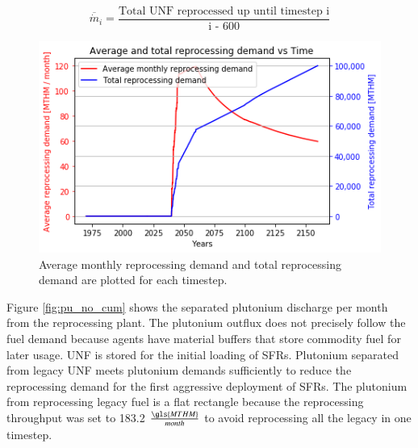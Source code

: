 \begin{equation}
\label{eqn:avg_rep}
\overline{\dot{m}}_i = \frac{\text{Total UNF reprocessed up until timestep i}}{\text{i - 600}}
\end{equation}


\begin{figure}[htbp!]
	\begin{center}
		\includegraphics[width=1.0\textwidth]{./images/french-transition/avg_tot_rep.png}
	\end{center}
	\caption{Average monthly reprocessing demand and total reprocessing demand are plotted
			 for each timestep.}
	\label{fig:avg_tot_rep}
\end{figure}



Figure \ref{fig:pu_no_cum} shows the separated plutonium discharge per 
month from the reprocessing plant. The plutonium outflux does not precisely 
follow the fuel demand because \Cyclus agents have material buffers that 
store commodity fuel for later usage. 
\gls{UNF} is stored for the initial loading of \glspl{SFR}.  Plutonium separated 
from legacy \gls{UNF} meets plutonium demands sufficiently to reduce the 
reprocessing demand for the first aggressive deployment of \glspl{SFR}.  
The plutonium from reprocessing legacy fuel is a flat rectangle because the 
reprocessing throughput was set to 183.2 $\frac{\gls{MTHM}}{month}$ to 
avoid reprocessing all the legacy in one timestep.

